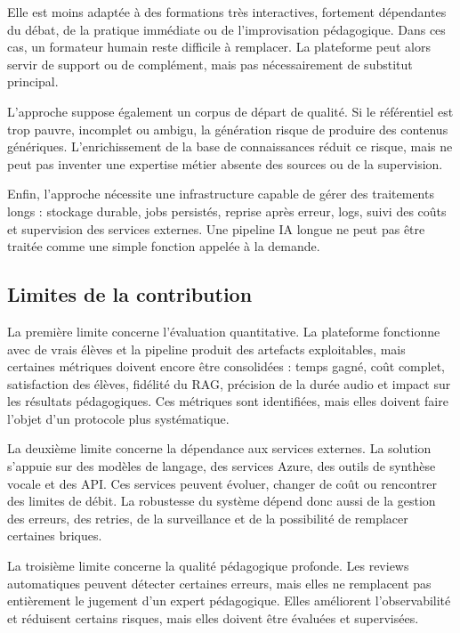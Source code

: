 \documentclass[12pt,a4paper]{article}
\begin{document}
Elle est moins adaptée à des formations très interactives, fortement dépendantes du débat,
de la pratique immédiate ou de l'improvisation pédagogique. Dans ces cas, un formateur
humain reste difficile à remplacer. La plateforme peut alors servir de support ou de
complément, mais pas nécessairement de substitut principal.

L'approche suppose également un corpus de départ de qualité. Si le référentiel est trop
pauvre, incomplet ou ambigu, la génération risque de produire des contenus génériques.
L'enrichissement de la base de connaissances réduit ce risque, mais ne peut pas inventer
une expertise métier absente des sources ou de la supervision.

Enfin, l'approche nécessite une infrastructure capable de gérer des traitements longs :
stockage durable, jobs persistés, reprise après erreur, logs, suivi des coûts et supervision
des services externes. Une pipeline IA longue ne peut pas être traitée comme une simple
fonction appelée à la demande.

\subsection{Limites de la contribution}

La première limite concerne l'évaluation quantitative. La plateforme fonctionne avec de
vrais élèves et la pipeline produit des artefacts exploitables, mais certaines métriques
doivent encore être consolidées : temps gagné, coût complet, satisfaction des élèves,
fidélité du RAG, précision de la durée audio et impact sur les résultats pédagogiques.
Ces métriques sont identifiées, mais elles doivent faire l'objet d'un protocole plus
systématique.

La deuxième limite concerne la dépendance aux services externes. La solution s'appuie
sur des modèles de langage, des services Azure, des outils de synthèse vocale et des API.
Ces services peuvent évoluer, changer de coût ou rencontrer des limites de débit. La
robustesse du système dépend donc aussi de la gestion des erreurs, des retries, de la
surveillance et de la possibilité de remplacer certaines briques.

La troisième limite concerne la qualité pédagogique profonde. Les reviews automatiques
peuvent détecter certaines erreurs, mais elles ne remplacent pas entièrement le jugement
d'un expert pédagogique. Elles améliorent l'observabilité et réduisent certains risques,
mais elles doivent être évaluées et supervisées.
\end{document}
